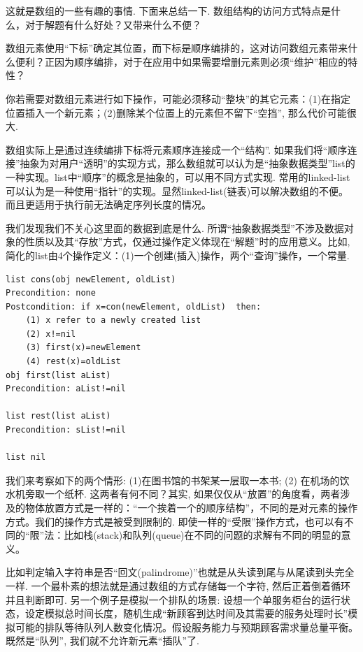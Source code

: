 这就是数组的一些有趣的事情. 下面来总结一下. 数组结构的访问方式特点是什么，对于解题有什么好处？又带来什么不便？

数组元素使用“下标”确定其位置，而下标是顺序编排的，这对访问数组元素带来什么便利？正因为顺序编排，对于在应用中如果需要增删元素则必须“维护”相应的特性？

你若需要对数组元素进行如下操作，可能必须移动“整块”的其它元素：(1)在指定位置插入一个新元素；(2)删除某个位置上的元素但不留下“空挡”, 那么代价可能很大. 

数组实际上是通过连续编排下标将元素顺序连接成一个“结构”. 如果我们将“顺序连接”抽象为对用户“透明”的实现方式，那么数组就可以认为是“抽象数据类型”list的一种实现。list中“顺序”的概念是抽象的，可以用不同方式实现. 常用的linked-list可以认为是一种使用“指针”的实现。显然linked-list(链表)可以解决数组的不便。而且更适用于执行前无法确定序列长度的情况。

我们发现我们不关心这里面的数据到底是什么. 所谓“抽象数据类型”不涉及数据对象的性质以及其“存放”方式，仅通过操作定义体现在“解题”时的应用意义。比如, 简化的list由4个操作定义：(1)一个创建(插入)操作，两个“查询”操作，一个常量.

\begin{lstlisting}
list cons(obj newElement, oldList)
Precondition: none
Postcondition: if x=con(newElement, oldList)  then:
    (1) x refer to a newly created list
    (2) x!=nil
    (3) first(x)=newElement
    (4) rest(x)=oldList
obj first(list aList)
Precondition: aList!=nil

list rest(list aList)
Precondition: sList!=nil

list nil
\end{lstlisting}



我们来考察如下的两个情形: (1)在图书馆的书架某一层取一本书; (2) 在机场的饮水机旁取一个纸杯. 这两者有何不同？其实, 如果仅仅从“放置”的角度看，两者涉及的物体放置方式是一样的：“一个挨着一个的顺序结构”，不同的是对元素的操作方式。我们的操作方式是被受到限制的. 即使一样的“受限”操作方式，也可以有不同的“限”法：比如栈(stack)和队列(queue)在不同的问题的求解有不同的明显的意义。


比如判定输入字符串是否“回文(palindrome)”也就是从头读到尾与从尾读到头完全一样. 一个最朴素的想法就是通过数组的方式存储每一个字符, 然后正着倒着循环并且判断即可. 另一个例子是模拟一个排队的场景: 设想一个单服务柜台的运行状态，设定模拟总时间长度，随机生成“新顾客到达时间及其需要的服务处理时长”模拟可能的排队等待队列人数变化情况。假设服务能力与预期顾客需求量总量平衡。既然是``队列'', 我们就不允许新元素``插队''了. 

